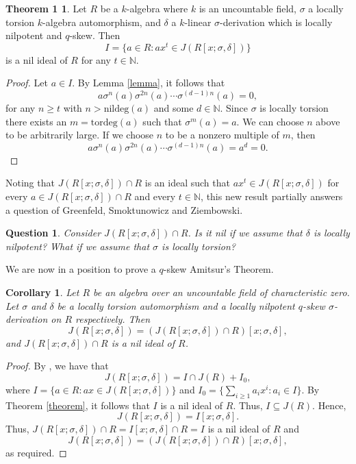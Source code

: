 \documentclass[12pt]{amsart}
\newtheorem{question}[thm]{Question}
\newtheorem{cor}[thm]{Corollary}
\theoremstyle{definition}
\theoremstyle{definition}
\theoremstyle{definition}
\theoremstyle{remark}
\theoremstyle{definition}
\newtheorem*{theorem1}{Theorem 1}
\begin{document}
\begin{theorem1}
    Let $R$ be a $k$-algebra where $k$ is an uncountable field, $\sigma$ a locally torsion $k$-algebra automorphism, and $\delta$ a $k$-linear $\sigma$-derivation which is locally nilpotent and $q$-skew. Then $$I = \{a\in R:ax^{t}\in J(R[x;\sigma,\delta])\}$$ is a nil ideal of $R$ for any $t \in \mathbb{N}$.
\end{theorem1}

\begin{proof}
    Let $a \in I$. By Lemma \ref{lemma}, it follows that \[
        a\sigma^n(a)\sigma^{2n}(a)\cdots\sigma^{(d-1)n}(a) = 0,
    \]for any $n \geq t$ with $n > \text{nildeg}(a)$ and some $d \in \mathbb{N}$.
    Since $\sigma$ is locally torsion there exists an $m = \text{tordeg}(a)$ such that $\sigma^m(a) =a$. We can choose $n$ above to be arbitrarily large. If we choose $n$ to be a nonzero multiple of $m$, then \[
    a\sigma^n(a)\sigma^{2n}(a)\cdots\sigma^{(d-1)n}(a) = a^d = 0.
    \]
\end{proof}

Noting that $J(R[x;\sigma,\delta])\cap R$ is an ideal such that $ax^{t} \in J(R[x;\sigma,\delta])$ for every $a \in J(R[x;\sigma,\delta])\cap R$ and every $t \in \mathbb{N}$, this new result partially answers a question of Greenfeld, Smoktunowicz and Ziembowski.

\begin{question}\cite[Question 6.17]{GreenfieldSmoktunowiczZiembowski}
    Consider $J(R[x;\sigma,\delta]) \cap R$. Is it nil if we assume that $\delta$ is locally nilpotent? What if we assume that $\sigma$ is locally torsion?
\end{question}

We are now in a position to prove a $q$-skew Amitsur's Theorem.

\begin{cor}
\label{qskewamitsur}
    Let $R$ be an algebra over an uncountable field of characteristic zero. Let $\sigma$ and $\delta$ be a locally torsion automorphism and a locally nilpotent $q$-skew $\sigma$-derivation on $R$ respectively. Then
    \[
        J(R[x;\sigma,\delta]) = (J(R[x;\sigma,\delta])\cap R)[x;\sigma,\delta],
    \] and $J(R[x;\sigma,\delta])\cap R$ is a nil ideal of $R$.
\end{cor}

\begin{proof}
    By \cite[Theorem 1]{shin2024jacobsonradicalsoreextensions}, we have that \[J(R[x;\sigma,\delta]) = I \cap J(R) +I_0,\]where $I = \{a \in R : ax \in J(R[x;\sigma,\delta])\}$ and $I_0 = \{ \sum_{i\geq 1} a_ix^i : a_i \in I\}$. By Theorem \ref{theorem}, it follows that $I$ is a nil ideal of $R$. Thus, $I \subseteq J(R)$. Hence,\[
        J(R[x;\sigma,\delta]) = I[x;\sigma,\delta].
    \] Thus, $J(R[x;\sigma,\delta]) \cap R = I[x;\sigma,\delta]\cap R = I$ is a nil ideal of $R$ and \[
        J(R[x;\sigma,\delta]) = (J(R[x;\sigma,\delta]) \cap R)[x;\sigma,\delta],
    \]as required.
\end{proof}
\end{document}
